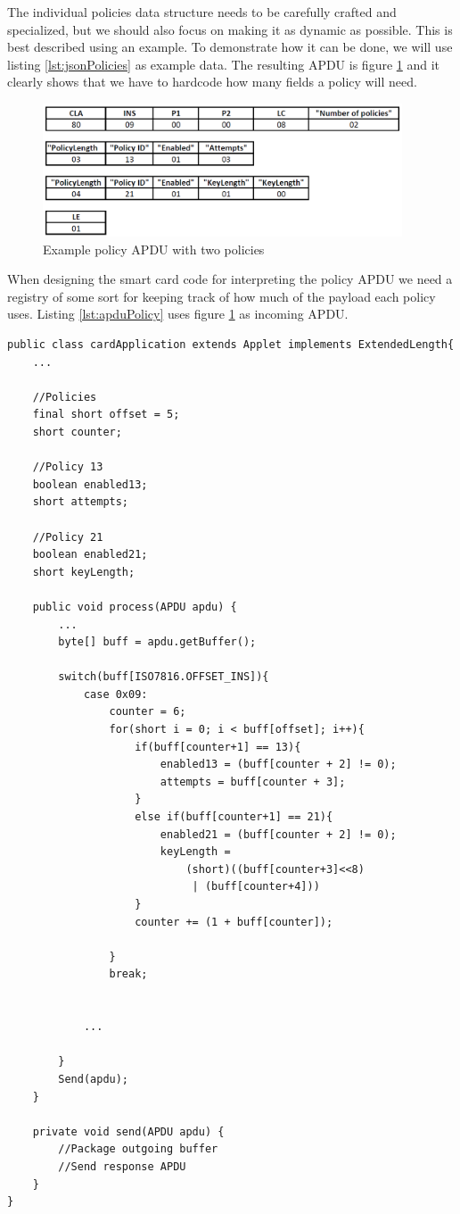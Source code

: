 The individual policies data structure needs to be carefully crafted and specialized, but we should also focus on making it as dynamic as possible. This is best described using an example. To demonstrate how it can be done, we will use listing \ref{lst:jsonPolicies} as example data. The resulting APDU is figure \ref{fig:policyAPDU} and it clearly shows that we have to hardcode how many fields a policy will need.

\begin{figure}[h!]
  \caption{Example policy APDU with two policies}
  \label{fig:policyAPDU}
  \centering
    \includegraphics[width=0.95\textwidth]{images/policyAPDU.png}
\end{figure}

When designing the smart card code for interpreting the policy APDU we need a registry of some sort for keeping track of how much of the payload each policy uses. Listing \ref{lst:apduPolicy} uses figure \ref{fig:policyAPDU} as incoming APDU.

\begin{lstlisting}[caption=Pseudo code for interpreting policy APDU with java smart card., label=lst:apduPolicy,escapechar=å]
public class cardApplication extends Applet implements ExtendedLength{
    ...

    //Policies
    final short offset = 5;
    short counter;

    //Policy 13
    boolean enabled13;
    short attempts;

    //Policy 21
    boolean enabled21;
    short keyLength;

    public void process(APDU apdu) {
    	...
        byte[] buff = apdu.getBuffer();

    	switch(buff[ISO7816.OFFSET_INS]){
            case 0x09:
                counter = 6;
                for(short i = 0; i < buff[offset]; i++){
                    if(buff[counter+1] == 13){
                        enabled13 = (buff[counter + 2] != 0);
                        attempts = buff[counter + 3];
                    }
                    else if(buff[counter+1] == 21){
                        enabled21 = (buff[counter + 2] != 0);
                        keyLength =
                            (short)((buff[counter+3]<<8)
                             | (buff[counter+4]))
                    }
                    counter += (1 + buff[counter]);

                }
                break;


            ...

    	}
    	Send(apdu);
    }

    private void send(APDU apdu) {
    	//Package outgoing buffer
    	//Send response APDU
    }
}
\end{lstlisting}

